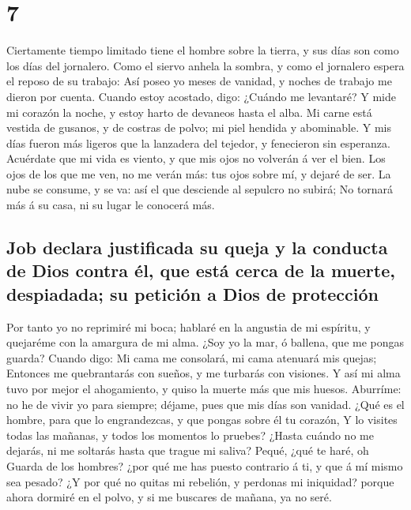 \hypertarget{section-18-7}{%
\section{7}\label{section-18-7}}

 Ciertamente tiempo limitado tiene el hombre sobre la
tierra, y sus días son como los días del jornalero.  Como
el siervo anhela la sombra, y como el jornalero espera el reposo de su
trabajo:  Así poseo yo meses de vanidad, y noches de
trabajo me dieron por cuenta.  Cuando estoy acostado,
digo: ¿Cuándo me levantaré? Y mide mi corazón la noche, y estoy harto de
devaneos hasta el alba.  Mi carne está vestida de gusanos,
y de costras de polvo; mi piel hendida y abominable.  Y
mis días fueron más ligeros que la lanzadera del tejedor, y fenecieron
sin esperanza.  Acuérdate que mi vida es viento, y que mis
ojos no volverán á ver el bien.  Los ojos de los que me
ven, no me verán más: tus ojos sobre mí, y dejaré de ser. 
La nube se consume, y se va: así el que desciende al sepulcro no subirá;
 No tornará más á su casa, ni su lugar le conocerá más.

\hypertarget{job-declara-justificada-su-queja-y-la-conducta-de-dios-contra-uxe9l-que-estuxe1-cerca-de-la-muerte-despiadada-su-peticiuxf3n-a-dios-de-protecciuxf3n}{%
\subsection{Job declara justificada su queja y la conducta de Dios
contra él, que está cerca de la muerte, despiadada; su petición a Dios
de
protección}\label{job-declara-justificada-su-queja-y-la-conducta-de-dios-contra-uxe9l-que-estuxe1-cerca-de-la-muerte-despiadada-su-peticiuxf3n-a-dios-de-protecciuxf3n}}

 Por tanto yo no reprimiré mi boca; hablaré en la
angustia de mi espíritu, y quejaréme con la amargura de mi alma.
 ¿Soy yo la mar, ó ballena, que me pongas guarda?
 Cuando digo: Mi cama me consolará, mi cama atenuará mis
quejas;  Entonces me quebrantarás con sueños, y me
turbarás con visiones.  Y así mi alma tuvo por mejor el
ahogamiento, y quiso la muerte más que mis huesos. 
Aburríme: no he de vivir yo para siempre; déjame, pues que mis días son
vanidad.  ¿Qué es el hombre, para que lo engrandezcas, y
que pongas sobre él tu corazón,  Y lo visites todas las
mañanas, y todos los momentos lo pruebes?  ¿Hasta cuándo
no me dejarás, ni me soltarás hasta que trague mi saliva?
 Pequé, ¿qué te haré, oh Guarda de los hombres? ¿por qué
me has puesto contrario á ti, y que á mí mismo sea pesado?
 ¿Y por qué no quitas mi rebelión, y perdonas mi
iniquidad? porque ahora dormiré en el polvo, y si me buscares de mañana,
ya no seré.

